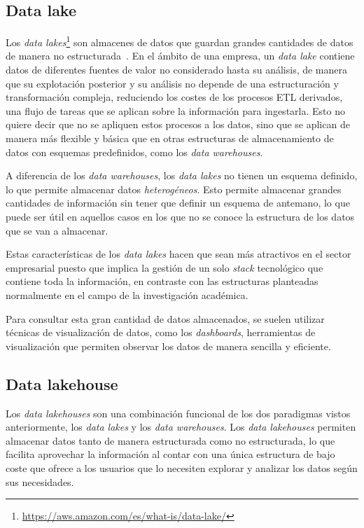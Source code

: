 \subsection{Data lake}\label{sec:lake}
Los \textit{data lakes}\footnote{
	\url{https://aws.amazon.com/es/what-is/data-lake/}
} son almacenes de datos que guardan grandes cantidades de datos de manera no
estructurada~\cite{mier2023dashboards}. En el ámbito de una empresa, un
\textit{data lake} contiene datos de diferentes fuentes de valor no considerado
hasta su análisis, de manera que su explotación posterior y su análisis no
depende de una estructuración y transformación compleja, reduciendo los costes
de los procesos ETL derivados, una flujo de tareas que se aplican sobre la
información para ingestarla. Esto no quiere decir que no se apliquen estos
procesos a los datos, sino que se aplican de manera más flexible y básica que en
otras estructuras de almacenamiento de datos con esquemas predefinidos, como los
\textit{data warehouses}.~\cite{pwint2018data}

A diferencia de los \textit{data warehouses}, los \textit{data lakes} no tienen
un esquema definido, lo que permite almacenar datos \textit{heterogéneos}. Esto
permite almacenar grandes cantidades de información sin tener que definir un
esquema de antemano, lo que puede ser útil en aquellos casos en los que no se
conoce la estructura de los datos que se van a almacenar.

Estas características de los \textit{data lakes} hacen que sean más atractivos
en el sector empresarial puesto que implica la gestión de un solo \textit{stack}
tecnológico que contiene toda la información, en contraste con las estructuras
planteadas normalmente en el campo de la investigación académica.

Para consultar esta gran cantidad de datos almacenados, se suelen utilizar
técnicas de visualización de datos, como los \textit{dashboards}, herramientas
de visualización que permiten observar los datos de manera sencilla y eficiente.


\subsection{Data lakehouse}\label{sec:lakehouse}
Los \textit{data lakehouses} son una combinación funcional de los dos paradigmas
vistos anteriormente, los \textit{data lakes} y los \textit{data warehouses}.
Los \textit{data lakehouses} permiten almacenar datos tanto de manera
estructurada como no estructurada, lo que facilita aprovechar la información al
contar con una única estructura de bajo coste que ofrece a los usuarios que lo
necesiten explorar y analizar los datos según sus necesidades.



